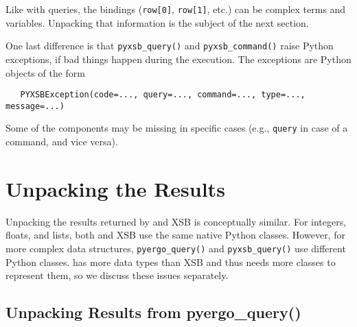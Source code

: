 Like with \ERGO queries, the bindings (\texttt{row[0]}, \texttt{row[1]},
etc.)
can be complex terms and variables. Unpacking that information is the
subject of the next section.

One last difference is that \texttt{pyxsb\_query()} and
\texttt{pyxsb\_command()} raise Python exceptions, if bad things happen
during the execution. The exceptions are Python objects of the form
\begin{verbatim}
   PYXSBException(code=..., query=..., command=..., type=..., message=...)
\end{verbatim}
Some of the components may be missing in specific cases (e.g.,
\texttt{query} in case of a command, and vice versa).


\section{Unpacking the Results}\label{sec-py-unpack}

Unpacking the results returned by \ERGO and XSB is conceptually similar.
For integers, floats, and lists, both \ERGO and XSB use the same native
Python classes.
However, for more complex data structures, \texttt{pyergo\_query()} and
\texttt{pyxsb\_query()} use different
Python classes. \ERGO has more data types than XSB and thus needs more
classes to represent them, so we discuss these issues separately.


\subsection{Unpacking Results from pyergo\_query()}

